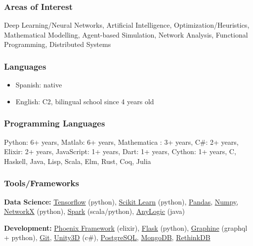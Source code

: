\documentclass[]{article}
\begin{document}
\subsubsection{Areas of Interest}\label{areas-of-interest}

Deep Learning/Neural Networks, Artificial Intelligence,
Optimization/Heuristics, Mathematical Modelling, Agent-based Simulation,
Network Analysis, Functional Programming, Distributed Systems

\subsubsection{Languages}\label{languages}

\begin{itemize}
\itemsep1pt\parskip0pt
\item
  Spanish: native
\item
  English: C2, bilingual school since 4 years old
\end{itemize}

\subsubsection{Programming Languages}\label{programming-languages}

Python: 6+ years, Matlab: 6+ years, Mathematica : 3+ years, C\#: 2+
years, Elixir: 2+ years, JavaScript: 1+ years, Dart: 1+ years, Cython:
1+ years, C, Haskell, Java, Lisp, Scala, Elm, Rust, Coq, Julia

\subsubsection{Tools/Frameworks}\label{toolsframeworks}

\textbf{Data Science:} \href{https://www.tensorflow.org/}{Tensorflow}
(python), \href{http://scikit-learn.org}{Scikit Learn} (python),
\href{http://pandas.pydata.org/}{Pandas},
\href{http://www.numpy.org/}{Numpy},
\href{https://networkx.github.io/}{NetworkX} (python),
\href{http://spark.apache.org/}{Spark} (scala/python),
\href{http://www.anylogic.com/}{AnyLogic} (java)

\textbf{Development:} \href{http://www.phoenixframework.org/}{Phoenix
Framework} (elixir), \href{http://flask.pocoo.org/}{Flask} (python),
\href{http://graphene-python.org/}{Graphine} (graphql + python),
\href{https://git-scm.com/}{Git}, \href{https://unity3d.com/}{Unity3D}
(c\#), \href{https://www.postgresql.org/}{PostgreSQL},
\href{https://www.mongodb.com/}{MongoDB},
\href{https://github.com/rethinkdb/rethinkdb}{RethinkDB}
\end{document}

